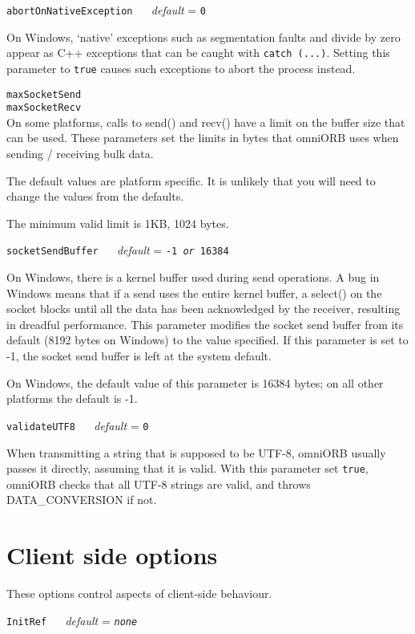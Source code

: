 \documentclass[11pt,twoside,a4paper]{book}
\makeatletter
\newcommand{\code}[1]{\texttt{#1}}
\newcommand{\confopt}[2]
  {\vspace{\baselineskip}\par\noindent\code{#1} ~~ \textit{default} =
   \code{#2}}
\renewcommand{\confopt}[2]
  {\vspace{\baselineskip}\par\noindent\code{#1} ~~ \textit{default} =
   \code{#2}\\[-1ex]\@afterheading}
\makeatother
\begin{document}
\confopt{abortOnNativeException}{0}

On Windows, `native' exceptions such as segmentation faults and divide
by zero appear as C++ exceptions that can be caught with \code{catch
  (...)}. Setting this parameter to \code{true} causes such exceptions
to abort the process instead.


\vspace{\baselineskip}\par
\noindent
\code{maxSocketSend}\\
\code{maxSocketRecv}\\[.1ex]

\noindent
On some platforms, calls to send() and recv() have a limit on the
buffer size that can be used. These parameters set the limits in bytes
that omniORB uses when sending / receiving bulk data.

The default values are platform specific. It is unlikely that you will
need to change the values from the defaults.

The minimum valid limit is 1KB, 1024 bytes.


\confopt{socketSendBuffer}{-1 \textit{or} 16384}

On Windows, there is a kernel buffer used during send operations.  A
bug in Windows means that if a send uses the entire kernel buffer, a
select() on the socket blocks until all the data has been acknowledged
by the receiver, resulting in dreadful performance. This parameter
modifies the socket send buffer from its default (8192 bytes on
Windows) to the value specified. If this parameter is set to -1, the
socket send buffer is left at the system default.

On Windows, the default value of this parameter is 16384 bytes; on all
other platforms the default is -1.


\confopt{validateUTF8}{0}

When transmitting a string that is supposed to be UTF-8, omniORB
usually passes it directly, assuming that it is valid. With this
parameter set \code{true}, omniORB checks that all UTF-8 strings are
valid, and throws DATA\_CONVERSION if not.


\section{Client side options}
\label{sec:clientconf}

These options control aspects of client-side behaviour.


\confopt{InitRef}{\textit{none}}
\end{document}
